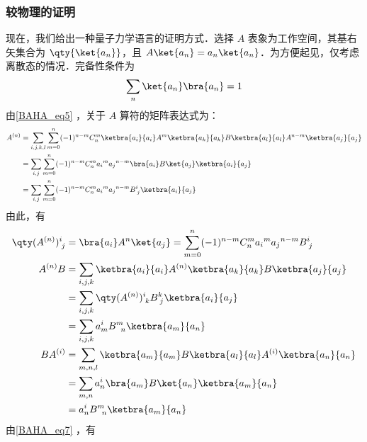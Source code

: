\subsubsection{较物理的证明}
现在，我们给出一种量子力学语言的证明方式．选择 $A$ 表象为工作空间，其基右矢集合为 $\qty{\ket{a_n}}$，且 $A\ket{a_n}=a_n\ket{a_n}$．为方便起见，仅考虑离散态的情况．完备性条件为
\begin{equation}
\sum_{n}\ket{a_n}\bra{a_n}=1
\end{equation}
由\autoref{BAHA_eq5} ，关于 $A$ 算符的矩阵表达式为：
\begin{equation}
\begin{aligned}
A^{(n)}&=\sum_{i,j,k,l}\sum_{m=0}^{n}(-1)^{n-m}C_{n}^{m}\ketbra{a_i}{a_i}A^m\ketbra{a_k}{a_k}B\ketbra{a_l}{a_l}A^{n-m}\ketbra{a_j}{a_j}\\
&=\sum_{i,j}\sum_{m=0}^{n}(-1)^{n-m}C_n^m{a_i}^m{a_j}^{n-m}\bra{a_i}B\ket{a_j}\ketbra{a_i}{a_j}\\
&=\sum_{i,j}\sum_{m=0}^{n}(-1)^{n-m}C_n^m{a_i}^m{a_j}^{n-m}B^i_{\; j}\ketbra{a_i}{a_j}
\end{aligned}
\end{equation}
由此，有
\begin{equation}\label{BAHA_eq7}
\begin{aligned}
\qty(A^{(n)})^{i}_{\; j}&=\bra{a_i}A^{n}\ket{a_j}=\sum_{m=0}^{n}(-1)^{n-m}C_n^m{a_i}^m{a_j}^{n-m}B^i_{\; j}\\
A^{(n)}B&=\sum_{i,j,k}\ketbra{a_i}{a_i}A^{(n)}\ketbra{a_k}{a_k}B\ketbra{a_j}{a_j}\\
&=\sum_{i,j,k}\qty(A^{(n)})^{i}_{\; k}B^{k}_{\;j}\ketbra{a_i}{a_j}\\
&=\sum_{i,j,k}a_m^iB^m_{\enspace n}\ketbra{a_m}{a_n}\\
BA^{(i)}&=\sum_{m,n,l}\ketbra{a_m}{a_m}B\ketbra{a_l}{a_l}A^{(i)}\ketbra{a_n}{a_n}\\
&=\sum_{m,n}a_n^i\bra{a_m}B\ket{a_n}\ketbra{a_m}{a_n}\\
&=a_n^iB^m_{\enspace n}\ketbra{a_m}{a_n}
\end{aligned}
\end{equation}
由\autoref{BAHA_eq7} ，有
\begin{equation}
[A^{(i)}]
\end{equation}

